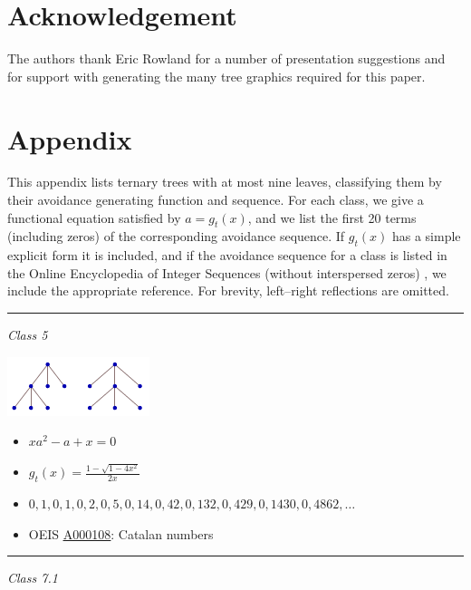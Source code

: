 \documentclass[12pt]{article}
\newcommand{\seqnum}[1]{\href{http://oeis.org/#1}{\underline{#1}}}
\begin{document}
\section{Acknowledgement}
The authors thank Eric Rowland for a number of presentation suggestions and for support with generating the many tree graphics required for this paper.

\section*{Appendix}

This appendix lists ternary trees with at most nine leaves, classifying them by their avoidance generating function and sequence.  For each class, we give a functional equation satisfied by $a=g_t(x)$, and we list the first 20 terms (including zeros) of the corresponding avoidance sequence.  If $g_t(x)$ has a simple explicit form it is included, and if the avoidance sequence for a class is listed in the Online Encyclopedia of Integer Sequences (without interspersed zeros) \cite{OEIS}, we include the appropriate reference.  For brevity, left--right reflections are omitted.

\vspace{5mm}

\hrule

\vspace{5mm}

\textit{Class 5}

\begin{center}
\includegraphics{ternary_class_5-1}
\end{center}

\begin{itemize}
\item $xa^2-a+x=0$
\item $g_t(x)=\frac{1- \sqrt{1-4x^2}}{2x}$
\item $0, 1, 0, 1, 0, 2, 0, 5, 0, 14, 0, 42, 0, 132, 0, 429, 0, 1430, 0, 4862,\dots$
\item OEIS \seqnum{A000108}: Catalan numbers
\end{itemize}

\hrule 

\vspace{5mm}

\textit{Class 7.1}
\end{document}
